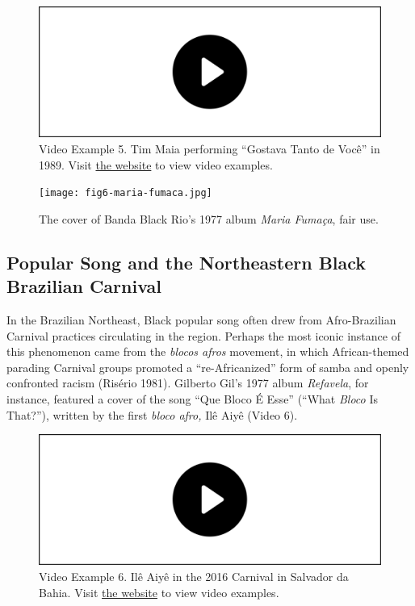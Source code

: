 \documentclass[twoside]{article}
\providecommand{\wmturlcaption}{
  Visit \href{https://worldmusictextbook.org/mcnally-2021}{the website} to view video examples.
}
\begin{document}
\begin{figure}
  \includegraphics[width=\textwidth]{../play-video.png}
  \caption*{Video Example 5. Tim Maia performing ``Gostava Tanto de Você'' in 1989. \wmturlcaption}
\end{figure}

\begin{figure}
  \texttt{[image: fig6-maria-fumaca.jpg]}
  \caption{The cover of Banda Black Rio's 1977 album \emph{Maria Fumaça}, fair use.}
\end{figure}

\hypertarget{popular-song-and-the-northeastern-black-brazilian-carnival}{%
\subsection*{Popular Song and the Northeastern Black Brazilian
Carnival}\label{popular-song-and-the-northeastern-black-brazilian-carnival}}

In the Brazilian Northeast, Black popular song often drew from
Afro-Brazilian Carnival practices circulating in the region. Perhaps the
most iconic instance of this phenomenon came from the \emph{blocos
afros} movement, in which African-themed parading Carnival groups
promoted a ``re-Africanized'' form of samba and openly confronted racism
(Risério 1981). Gilberto Gil's 1977 album \emph{Refavela}, for instance,
featured a cover of the song ``Que Bloco É Esse'' (``What \emph{Bloco}
Is That?''), written by the first \emph{bloco afro,} Ilê Aiyê (Video 6).

\begin{figure}
  \includegraphics[width=\textwidth]{../play-video.png}
  \caption*{Video Example 6. Ilê Aiyê in the 2016 Carnival in Salvador da Bahia. \wmturlcaption}
\end{figure}
\end{document}
